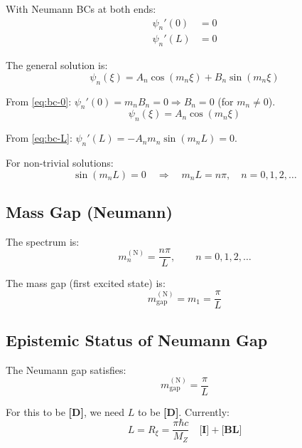 \documentclass[11pt,a4paper]{article}
\newcommand{\Rxi}{R_\xi}
\newcommand{\mgap}{m_{\mathrm{gap}}}
\newcommand{\MZ}{M_Z}
\newcommand{\tagD}{\textbf{[D]}}
\newcommand{\tagI}{\textbf{[I]}}
\newcommand{\tagBL}{\textbf{[BL]}}
\theoremstyle{definition}
\theoremstyle{plain}
\theoremstyle{remark}
\begin{document}
With Neumann BCs at both ends:
\begin{align}
\psi_n'(0) &= 0 \label{eq:bc-0} \\
\psi_n'(L) &= 0 \label{eq:bc-L}
\end{align}

The general solution is:
\begin{equation}
\psi_n(\xi) = A_n\cos(m_n\xi) + B_n\sin(m_n\xi)
\label{eq:general-soln}
\end{equation}

From \cref{eq:bc-0}: $\psi_n'(0) = m_n B_n = 0 \Rightarrow B_n = 0$ (for $m_n \neq 0$).
\begin{equation}
\psi_n(\xi) = A_n\cos(m_n\xi)
\label{eq:cosine-mode}
\end{equation}

From \cref{eq:bc-L}: $\psi_n'(L) = -A_n m_n\sin(m_n L) = 0$.

For non-trivial solutions:
\begin{equation}
\sin(m_n L) = 0 \quad \Rightarrow \quad m_n L = n\pi, \quad n = 0, 1, 2, \ldots
\label{eq:neumann-quantization}
\end{equation}

\subsection{Mass Gap (Neumann)}

The spectrum is:
\begin{equation}
\boxed{m_n^{\mathrm{(N)}} = \frac{n\pi}{L}, \qquad n = 0, 1, 2, \ldots}
\label{eq:neumann-spectrum}
\end{equation}

The mass gap (first excited state) is:
\begin{equation}
\boxed{\mgap^{\mathrm{(N)}} = m_1 = \frac{\pi}{L}}
\label{eq:neumann-gap}
\end{equation}

\subsection{Epistemic Status of Neumann Gap}

The Neumann gap satisfies:
\begin{equation}
\mgap^{\mathrm{(N)}} = \frac{\pi}{L}
\label{eq:gap-neumann-form}
\end{equation}

For this to be \tagD{}, we need $L$ to be \tagD{}. Currently:
\begin{equation}
L = \Rxi = \frac{\pi\hbar c}{\MZ} \quad \tagI{}+\tagBL{}
\label{eq:L-status}
\end{equation}
\end{document}
